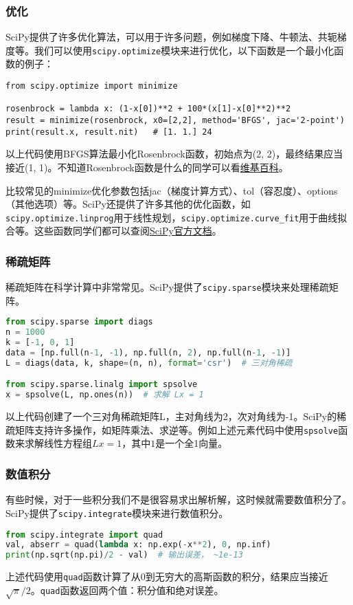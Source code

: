 \documentclass[../main.tex]{subfiles}
\begin{document}
\subsubsection{优化}
SciPy提供了许多优化算法，可以用于许多问题，例如梯度下降、牛顿法、共轭梯度等。我们可以使用\texttt{scipy.optimize}模块来进行优化，以下函数是一个最小化函数的例子：
\begin{lstlisting}
from scipy.optimize import minimize

rosenbrock = lambda x: (1-x[0])**2 + 100*(x[1]-x[0]**2)**2
result = minimize(rosenbrock, x0=[2,2], method='BFGS', jac='2-point')
print(result.x, result.nit)   # [1. 1.] 24
\end{lstlisting}
以上代码使用BFGS算法最小化Rosenbrock函数，初始点为(2, 2)，最终结果应当接近(1, 1)。不知道Rosenbrock函数是什么的同学可以看\href{https://en.wikipedia.org/wiki/Rosenbrock_function}{维基百科}。

比较常见的minimize优化参数包括jac（梯度计算方式）、tol（容忍度）、options（其他选项）等。SciPy还提供了许多其他的优化函数，如\texttt{scipy.optimize.linprog}用于线性规划，\texttt{scipy.optimize.curve\_fit}用于曲线拟合等。这些函数同学们都可以查阅\href{https://docs.scipy.org/doc/scipy/reference/optimize.html}{SciPy官方文档}。

\subsubsection{稀疏矩阵}

稀疏矩阵在科学计算中非常常见。SciPy提供了\texttt{scipy.sparse}模块来处理稀疏矩阵。

\begin{lstlisting}[language=python]
from scipy.sparse import diags
n = 1000
k = [-1, 0, 1]
data = [np.full(n-1, -1), np.full(n, 2), np.full(n-1, -1)]
L = diags(data, k, shape=(n, n), format='csr')  # 三对角稀疏

from scipy.sparse.linalg import spsolve
x = spsolve(L, np.ones(n))  # 求解 Lx = 1
\end{lstlisting}
以上代码创建了一个三对角稀疏矩阵L，主对角线为2，次对角线为-1。SciPy的稀疏矩阵支持许多操作，如矩阵乘法、求逆等。例如上述元素代码中使用\texttt{spsolve}函数来求解线性方程组$Lx = 1$，其中$1$是一个全1向量。

\subsubsection{数值积分}

有些时候，对于一些积分我们不是很容易求出解析解，这时候就需要数值积分了。SciPy提供了\texttt{scipy.integrate}模块来进行数值积分。
\begin{lstlisting}[language=python]
from scipy.integrate import quad
val, abserr = quad(lambda x: np.exp(-x**2), 0, np.inf)
print(np.sqrt(np.pi)/2 - val)  # 输出误差， ~1e-13
\end{lstlisting}
上述代码使用\texttt{quad}函数计算了从0到无穷大的高斯函数的积分，结果应当接近$\sqrt{\pi}/2$。\texttt{quad}函数返回两个值：积分值和绝对误差。
\end{document}
